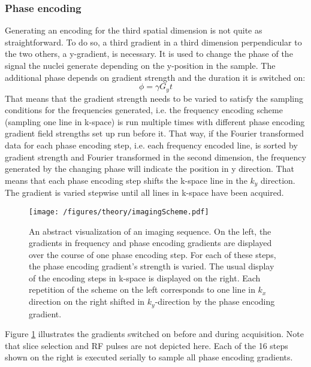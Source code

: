         \subsubsection{Phase encoding}
            Generating an encoding for the third spatial dimension is not quite as straightforward.  To do so, a third gradient in a third dimension perpendicular to the two others, a y-gradient, is necessary.  It is used to change the phase of the signal the nuclei generate depending on the y-position in the sample. The additional phase depends on gradient strength and the duration it is switched on:
            \begin{equation}
                \phi = \gamma G_y t
            \end{equation}
            That means that the gradient strength needs to be varied to satisfy the sampling conditions for the frequencies generated, i.e. the frequency encoding scheme (sampling one line in k-space) is run multiple times with different phase encoding gradient field strengths set up run before it. That way, if the Fourier transformed data for each phase encoding step, i.e. each frequency encoded line, is sorted by gradient strength and Fourier transformed in the second dimension, the frequency generated by the changing phase will indicate the position in y direction. That means that each phase encoding step shifts the k-space line in the $k_y$ direction. The gradient is varied stepwise until all lines in k-space have been acquired.
            \begin{figure}
                \texttt{[image: /figures/theory/imagingScheme.pdf]}
                \centering
                \caption[k-space Graph]{An abstract visualization of an imaging sequence. On the left, the gradients in frequency and phase encoding gradients are displayed over the course of one phase encoding step. For each of these steps, the phase encoding gradient's strength is varied. The usual display of the encoding steps in k-space is displayed on the right. Each repetition of the scheme on the left corresponds to one line in $k_x$ direction on the right shifted in $k_y$-direction by the phase encoding gradient.}
                \label{figure:theory:MRIScheme}
            \end{figure}
            Figure \ref{figure:theory:MRIScheme} illustrates the gradients switched on before and during acquisition. Note that slice selection and RF pulses are not depicted here. Each of the 16 steps shown on the right is executed serially to sample all phase encoding gradients.
